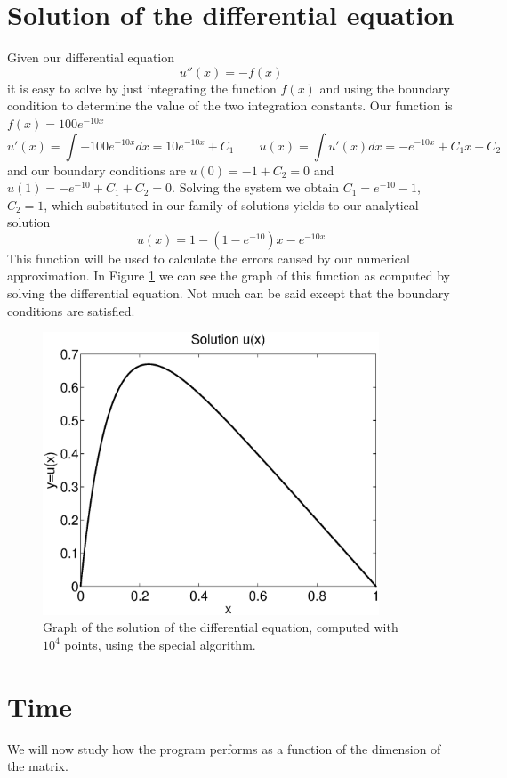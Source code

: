 \documentclass {article}
\begin{document}
\section{Solution of the differential equation}

Given our differential equation
$$u''(x)=-f(x)$$
it is easy to solve by just integrating the function $f(x)$ and using the boundary condition to determine the value of the two integration constants. Our function is $f(x)=100 e^{-10x}$
$$u'(x)=\int -100 e^{-10x} dx=10 e^{-10 x}+C_1 \quad \quad u(x)= \int u'(x) dx=-e^{-10x}+ C_1 x+ C_2$$
and our boundary conditions are $u(0)=-1+C_2=0$ and $u(1)=-e^{-10}+C_1+C_2=0$. Solving the system we obtain $C_1=e^{-10}-1$, $C_2=1$, which substituted in our family of solutions yields to our analytical solution
$$u(x)=1-(1-e^{-10})x-e^{-10 x}$$
This function will be used to calculate the errors caused by our numerical approximation. In Figure \ref{fig:solution} we can see the graph of this function as computed by solving the differential equation. Not much can be said except that the boundary conditions are satisfied.

\begin{figure}[H]
	\centering
	\includegraphics[width=10cm]{solution}
	\caption{Graph of the solution of the differential equation, computed with $10^4$ points, using the special algorithm.}
	\label{fig:solution}
\end{figure} 

\section{Time}

We will now study how the program performs as a function of the dimension of the matrix. 
\end{document}
